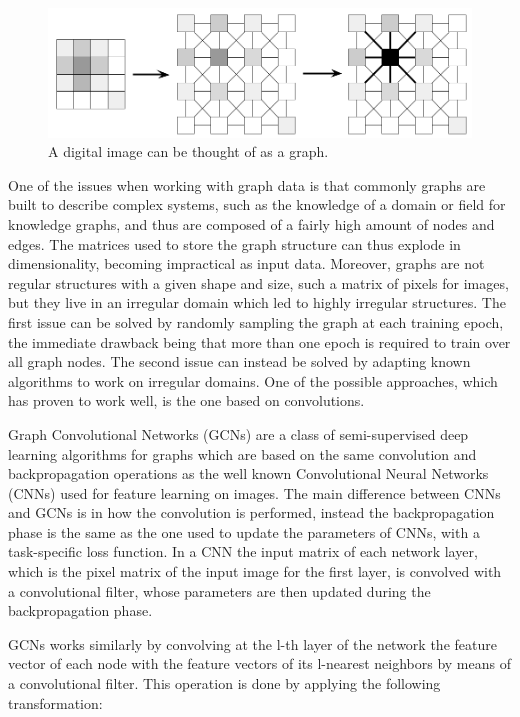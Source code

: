 \documentclass[%
    corpo=13.5pt,
    twoside,
    oldstyle,
    tipotesi=magistrale,
    greek,
    evenboxes
]{toptesi}
\begin{document}
\begin{figure}[h]
    \centering
    \includegraphics[scale=0.4]{img/pixels-as-graph.png}
    \caption{A digital image can be thought of as a graph.}
    \label{fig:pixels-as-graph}
\end{figure}

One of the issues when working with graph data is that commonly graphs
are built to describe complex systems, such as the knowledge of a
domain or field for knowledge graphs, and thus are composed of
a fairly high amount of nodes and edges. The matrices used to
store the graph structure can thus explode in dimensionality, becoming
impractical as input data. Moreover, graphs are not
regular structures with a given shape and size, such a matrix of pixels
for images, but they live in an irregular domain which led to highly
irregular structures.
The first issue can be solved by randomly sampling the graph at each
training epoch, the immediate drawback being that more than one epoch
is required to train over all graph nodes. The second issue can instead be
solved by adapting known algorithms to work on irregular domains.
One of the possible approaches, which has proven to work well, is
the one based on convolutions.

Graph Convolutional Networks (GCNs) \cite{kipf2016} are a class of
semi-supervised deep learning algorithms for graphs which are based on the
same convolution and backpropagation operations as the well known
Convolutional Neural Networks\cite{krizhevsky2012} (CNNs) used for feature
learning on images.
The main difference between CNNs and GCNs is in how the convolution is
performed, instead the backpropagation phase is the same as the one
used to update the parameters of CNNs, with a task-specific loss function.
In a CNN the input matrix of each network layer, which is the pixel matrix
of the input image for the first layer, is convolved with a convolutional
filter, whose parameters are then updated during the backpropagation phase.

GCNs works similarly by convolving at the l-th layer
of the network the feature vector of each node with the feature
vectors of its l-nearest neighbors by means of a convolutional filter.
This operation is done by applying the following transformation:
\end{document}
